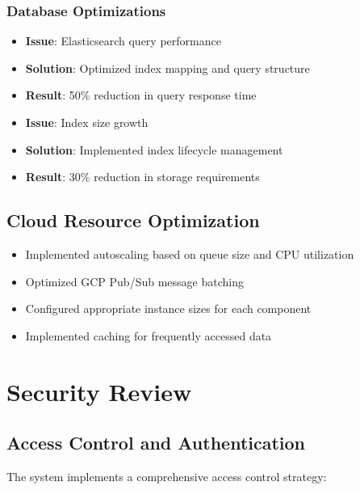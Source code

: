 \documentclass[12pt,a4paper]{report}
\begin{document}
\subsection{Database Optimizations}
\begin{itemize}
    \item \textbf{Issue}: Elasticsearch query performance
    \item \textbf{Solution}: Optimized index mapping and query structure
    \item \textbf{Result}: 50\% reduction in query response time
\end{itemize}

\begin{itemize}
    \item \textbf{Issue}: Index size growth
    \item \textbf{Solution}: Implemented index lifecycle management
    \item \textbf{Result}: 30\% reduction in storage requirements
\end{itemize}

\section{Cloud Resource Optimization}
\begin{itemize}
    \item Implemented autoscaling based on queue size and CPU utilization
    \item Optimized GCP Pub/Sub message batching
    \item Configured appropriate instance sizes for each component
    \item Implemented caching for frequently accessed data
\end{itemize}



\chapter{Security Review}

\section{Access Control and Authentication}
The system implements a comprehensive access control strategy:
\end{document}
